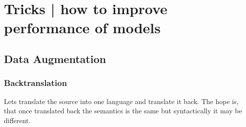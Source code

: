 \documentclass[11pt]{article}
\begin{document}
\begin{figure}[H]
    \centering
\end{figure}

\section{Tricks | how to improve performance of models}

\subsection{Data Augmentation}

\subsubsection{Backtranslation}

Lets translate the source into one language and translate it back. The hope is, that once translated back the semantics is the same but syntactically it may be different.
\end{document}

